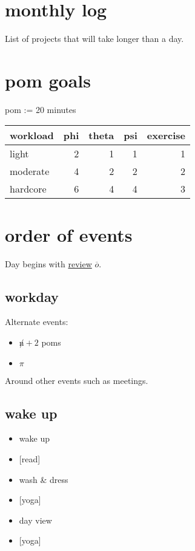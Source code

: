 \documentclass[]{book}
\providecommand{\tightlist}{%
  \setlength{\itemsep}{0pt}\setlength{\parskip}{0pt}}
\begin{document}
\hypertarget{monthly-log}{%
\section{monthly log}\label{monthly-log}}

List of projects that will take longer than a day.

\hypertarget{pom-goals}{%
\section{pom goals}\label{pom-goals}}

pom := 20 minutes

\begin{tabular}{l|r|r|r|r}
\hline
workload & phi & theta & psi & exercise\\
\hline
light & 2 & 1 & 1 & 1\\
\hline
moderate & 4 & 2 & 2 & 2\\
\hline
hardcore & 6 & 4 & 4 & 3\\
\hline
\end{tabular}

\hypertarget{order-of-events}{%
\section{order of events}\label{order-of-events}}

Day begins with \protect\hyperlink{review}{review} \(\overline o\).

\hypertarget{workday}{%
\subsection{workday}\label{workday}}

Alternate events:

\begin{itemize}
\tightlist
\item
  \(\not n + 2\) poms
\item
  \(\pi\)
\end{itemize}

Around other events such as meetings.

\hypertarget{wake-up}{%
\subsection{wake up}\label{wake-up}}

\begin{itemize}
\tightlist
\item
  wake up
\item
  {[}read{]}
\item
  wash \& dress
\item
  {[}yoga{]}
\item
  \protect\hypertarget{day-view}{}{day view}
\item
  {[}yoga{]}
\end{itemize}
\end{document}
